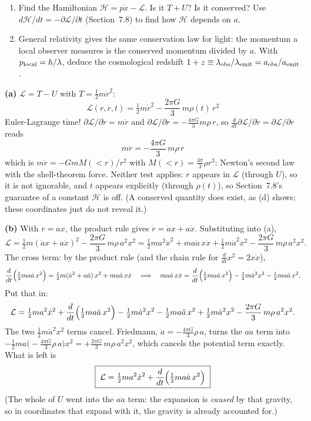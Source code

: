 \documentclass[11pt,letterpaper]{article}
\newif\ifsolutions \solutionstrue
\newcommand{\Lag}{\mathcal{L}}
\newcommand{\Ham}{\mathcal{H}}
\begin{document}
{\begin{enumerate}
  expansion, falls as $1/a$. (When the universe doubles in size, a galaxy's random motion halves.)
\item Find the Hamiltonian $\Ham = p\dot x - \Lag$. Is it $T + U$? Is it conserved? Use
  $d\Ham/dt = -\partial\Lag/\partial t$ (Section~7.8) to find how $\Ham$ depends on $a$.
\item General relativity gives the same conservation law for light: the momentum a local
  observer measures is the conserved momentum divided by $a$. With $p_{\rm local} = h/\lambda$,
  deduce the cosmological redshift $1 + z \equiv \lambda_{\rm obs}/\lambda_{\rm emit} =
  a_{\rm obs}/a_{\rm emit}$.
\end{enumerate}}

\ifsolutions
\textbf{(a)} $\Lag = T - U$ with $T = \tfrac12 m\dot r^2$:
\[
  \boxed{\;\Lag(r, \dot r, t) = \tfrac12 m\dot r^2 - \frac{2\pi G}{3}\,m\rho(t)\,r^2\;}
\]
Euler-Lagrange time! $\partial\Lag/\partial\dot r = m\dot r$ and
$\partial\Lag/\partial r = -\frac{4\pi G}{3} m\rho\, r$, so
$\frac{d}{dt}\partial\Lag/\partial\dot r = \partial\Lag/\partial r$ reads
\[
  \boxed{\; m\ddot r = -\frac{4\pi G}{3}\,m\rho\, r \;}
\]
which is $m\ddot r = -GmM(<r)/r^2$ with $M(<r) = \frac{4\pi}{3}\rho r^3$: Newton's second law
with the shell-theorem force. Neither test applies: $r$ appears in $\Lag$ (through $U$), so it
is not ignorable, and $t$ appears explicitly (through $\rho(t)$), so Section~7.8's guarantee of
a constant $\Ham$ is off. (A conserved quantity does exist, as (d) shows; these coordinates just
do not reveal it.)

\textbf{(b)} With $r = ax$, the product rule gives $\dot r = \dot a x + a\dot x$. Substituting
into (a),
\[
  \Lag = \tfrac12 m(\dot a x + a\dot x)^2 - \frac{2\pi G}{3}\, m\rho\, a^2 x^2
  = \tfrac12 m a^2\dot x^2 + m a\dot a\, x\dot x + \tfrac12 m\dot a^2 x^2 - \frac{2\pi G}{3}\, m\rho\, a^2 x^2 .
\]
The cross term: by the product rule (and the chain rule for $\frac{d}{dt}x^2 = 2x\dot x$),
\[
  \frac{d}{dt}\Bigl(\tfrac12 m a\dot a\,x^2\Bigr)
  = \tfrac12 m(\dot a^2 + a\ddot a)\,x^2 + m a\dot a\,x\dot x
  \quad\Longrightarrow\quad
  m a\dot a\,x\dot x = \frac{d}{dt}\Bigl(\tfrac12 m a\dot a\,x^2\Bigr) - \tfrac12 m\dot a^2 x^2 - \tfrac12 m a\ddot a\,x^2 .
\]
Put that in:
\[
  \Lag = \tfrac12 m a^2\dot x^2 + \frac{d}{dt}\Bigl(\tfrac12 m a\dot a\,x^2\Bigr)
  - \tfrac12 m\dot a^2 x^2 - \tfrac12 m a\ddot a\,x^2 + \tfrac12 m\dot a^2 x^2 - \frac{2\pi G}{3}\, m\rho\, a^2 x^2 .
\]
The two $\tfrac12 m\dot a^2 x^2$ terms cancel. Friedmann, $\ddot a = -\frac{4\pi G}{3}\rho\,a$,
turns the $a\ddot a$ term into
$-\tfrac12 m a\bigl(-\frac{4\pi G}{3}\rho\,a\bigr)x^2 = +\frac{2\pi G}{3}\,m\rho\,a^2x^2$, which
cancels the potential term exactly. What is left is
\[
  \boxed{\;\Lag = \tfrac12 m a^2\dot x^2 + \frac{d}{dt}\Bigl(\tfrac12 m a\dot a\,x^2\Bigr)\;}
\]
(The whole of $U$ went into the $a\ddot a$ term: the expansion is \emph{caused} by that
gravity, so in coordinates that expand with it, the gravity is already accounted for.)
\end{document}
